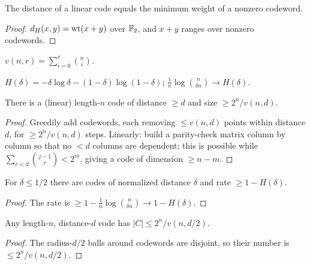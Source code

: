 \begin{lemma}
  \label{lem:distance-min-weight}
  The distance of a linear code equals the minimum weight of a nonzero codeword.
\end{lemma}
\begin{proof}
  $d_H(x,y)=\operatorname{wt}(x+y)$ over $\mathbb{F}_2$, and $x+y$ ranges over nonzero codewords.
\end{proof}

\begin{definition}
  \label{def:ball-volume}
  $v(n,r)=\sum_{i=0}^r\binom ni$.
\end{definition}

\begin{definition}
  \label{def:binary-entropy}
  \mathlibok
  $H(\delta)=-\delta\log\delta-(1-\delta)\log(1-\delta)$; $\tfrac1n\log\binom
  n{\delta n}\to H(\delta)$.
\end{definition}

\begin{theorem}
  \label{thm:gilbert-varshamov}
  There is a (linear) length-$n$ code of distance $\ge d$ and size
  $\ge2^n/v(n,d)$.
\end{theorem}
\begin{proof}
  Greedily add codewords, each removing $\le v(n,d)$ points within distance $d$,
  for $\ge2^n/v(n,d)$ steps. Linearly: build a parity-check matrix column by
  column so that no $<d$ columns are dependent; this is possible while
  $\sum_{r<d}\binom{j-1}r<2^m$, giving a code of dimension $\ge n-m$.
\end{proof}

\begin{corollary}
  \label{cor:gv-asymptotic}
  For $\delta\le1/2$ there are codes of normalized distance $\delta$ and rate
  $\ge1-H(\delta)$.
\end{corollary}
\begin{proof}
  The rate is $\ge1-\tfrac1n\log\binom n{\delta n}\to1-H(\delta)$.
\end{proof}

\begin{theorem}
  \label{thm:sphere-packing}
  Any length-$n$, distance-$d$ code has $|C|\le2^n/v(n,d/2)$.
\end{theorem}
\begin{proof}
  The radius-$d/2$ balls around codewords are disjoint, so their number is
  $\le2^n/v(n,d/2)$.
\end{proof}

